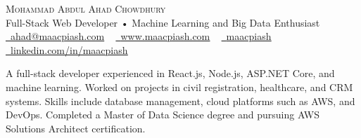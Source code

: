 \documentclass[12pt,a4paper]{article}
\newcommand{\resumeSubHeadingListStart}{\begin{itemize}[leftmargin=0.0in, label={}]\itemsep0.75em}
\newcommand{\resumeSubHeadingListEnd}{\end{itemize}}
\begin{document}
\begin{center}
  {\Huge \scshape Mohammad Abdul Ahad Chowdhury} \\ \vspace{5pt}
  Full-Stack Web Developer • Machine Learning and Big Data Enthusiast \\ \vspace{5pt}
  \small \href{mailto:ahad@maacpiash.com}{\raisebox{-0.2\height}\faEnvelope\  \underline{ahad@maacpiash.com}} ~ \href{https://www.maacpiash.com}{\raisebox{-0.2\height}\faGlobe\ \underline{www.maacpiash.com}} ~ \href{https://github.com/maacpiash}{\raisebox{-0.2\height}\faGithub\ \underline{maacpiash}} ~
  \href{https://linkedin.com/in/maacpiash}{\raisebox{-0.2\height}\faLinkedin\ \underline{linkedin.com/in/maacpiash}}
  \vspace{5pt}
\end{center}



\begin{justify}
A full-stack developer experienced in React.js, Node.js, ASP.NET Core, and machine learning. Worked on projects in civil registration, healthcare, and CRM systems. Skills include database management, cloud platforms such as AWS, and DevOps. Completed a Master of Data Science degree and pursuing AWS Solutions Architect certification.
\end{justify}
\end{document}
